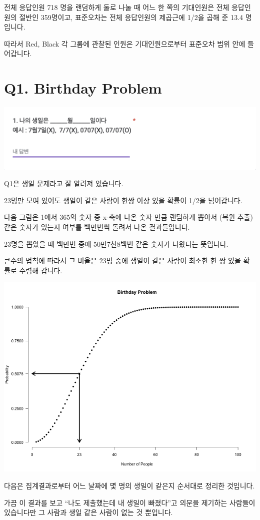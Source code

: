 \documentclass[
]{book}
\begin{document}
전체 응답인원 718 명을 랜덤하게 둘로 나눌 때 어느 한 쪽의 기대인원은 전체 응답인원의 절반인 359명이고, 표준오차는 전체 응답인원의 제곱근에 1/2을 곱해 준 13.4 명입니다.

따라서 Red, Black 각 그룹에 관찰된 인원은 기대인원으로부터 표준오차 범위 안에 들어갑니다.

\section{Q1. Birthday Problem}\label{q1.-birthday-problem}

\includegraphics[width=0.75\linewidth]{./pics/Quiz240524_Q1}

Q1은 생일 문제라고 잘 알려져 있습니다.

23명만 모여 있어도 생일이 같은 사람이 한쌍 이상 있을 확률이 1/2을 넘어갑니다.

다음 그림은 1에서 365의 숫자 중 x-축에 나온 숫자 만큼 랜덤하게 뽑아서 (복원 추출) 같은 숫자가 있는지 여부를 백만번씩 돌려서 나온 결과들입니다.

23명을 뽑았을 때 백만번 중에 50만7천8백번 같은 숫자가 나왔다는 뜻입니다.

큰수의 법칙에 따라서 그 비율은 23명 중에 생일이 같은 사람이 최소한 한 쌍 있을 확률로 수렴해 갑니다.

\includegraphics[width=0.75\linewidth]{./pics/birthday_simulation}

다음은 집계결과로부터 어느 날짜에 몇 명의 생일이 같은지 순서대로 정리한 것입니다.

가끔 이 결과를 보고 ``나도 제출했는데 내 생일이 빠졌다''고 의문을 제기하는 사람들이 있습니다만 그 사람과 생일 같은 사람이 없는 것 뿐입니다.
\end{document}
